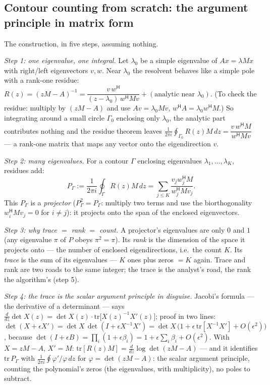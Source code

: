 \documentclass[11pt,a4paper]{article}
\newcommand{\hp}{^{\mathsf H}}
\begin{document}
{\subsection{Contour counting from scratch: the argument principle in matrix form}
\label{sec:contour}


The construction, in five steps, assuming nothing.

\emph{Step 1: one eigenvalue, one integral.}  Let $\lambda_0$ be a simple eigenvalue of
$Ax=\lambda Mx$ with right/left eigenvectors $v,w$.  Near $\lambda_0$ the resolvent
behaves like a simple pole with a rank-one residue:
$R(z)=(zM-A)^{-1}=\dfrac{v\,w\hp}{(z-\lambda_0)\,w\hp Mv}+(\text{analytic near }\lambda_0)$.
(To check the residue: multiply by $(zM-A)$ and use $Av=\lambda_0Mv$, $w\hp A=\lambda_0w\hp M$.)
So integrating around a small circle $\Gamma_0$ enclosing only $\lambda_0$, the analytic
part contributes nothing and the residue theorem leaves
$\tfrac1{2\pi i}\oint_{\Gamma_0}R(z)M\,dz=\dfrac{v\,w\hp M}{w\hp Mv}$ --- a rank-one
matrix that maps any vector onto the eigendirection $v$.

\emph{Step 2: many eigenvalues.}  For a contour $\Gamma$ enclosing eigenvalues
$\lambda_1,\dots,\lambda_K$, residues add:
\[
P_\Gamma:=\frac1{2\pi i}\oint_\Gamma R(z)M\,dz
=\sum_{j\le K}\frac{v_jw_j\hp M}{w_j\hp Mv_j}.
\]
This $P_\Gamma$ is a \emph{projector} ($P_\Gamma^2=P_\Gamma$: multiply two terms and use
the biorthogonality $w_i\hp Mv_j=0$ for $i\ne j$): it projects onto the span of the
enclosed eigenvectors.

\emph{Step 3: why trace $=$ rank $=$ count.}  A projector's eigenvalues are only $0$ and
$1$ (any eigenvalue $\pi$ of $P$ obeys $\pi^2=\pi$).  Its \emph{rank} is the dimension of
the space it projects onto --- the number of enclosed eigendirections, i.e.\ the count
$K$.  Its \emph{trace} is the sum of its eigenvalues --- $K$ ones plus zeros $=K$ again.
Trace and rank are two roads to the same integer; the trace is the analyst's road, the
rank the algorithm's (step 5).

\emph{Step 4: the trace is the scalar argument principle in disguise.}  Jacobi's formula
--- the derivative of a determinant --- says
$\tfrac{d}{dz}\det X(z)=\det X(z)\cdot\mathrm{tr}\bigl[X(z)^{-1}X'(z)\bigr]$; proof in
two lines:
$\det(X+\epsilon X')=\det X\,\det(I+\epsilon X^{-1}X')
=\det X\,\bigl(1+\epsilon\,\mathrm{tr}[X^{-1}X']+O(\epsilon^2)\bigr)$, because
$\det(I+\epsilon B)=\prod_i(1+\epsilon\beta_i)=1+\epsilon\sum_i\beta_i+O(\epsilon^2)$.
With $X=zM-A$, $X'=M$:
$\mathrm{tr}[R(z)M]=\tfrac{d}{dz}\log\det(zM-A)$ --- and it
identifies $\mathrm{tr}\,P_\Gamma$ with $\tfrac1{2\pi i}\oint\varphi'/\varphi\,dz$ for
$\varphi=\det(zM-A)$: the scalar argument principle, counting the polynomial's zeros
(the eigenvalues, with multiplicity), no poles to subtract.

}
\end{document}
